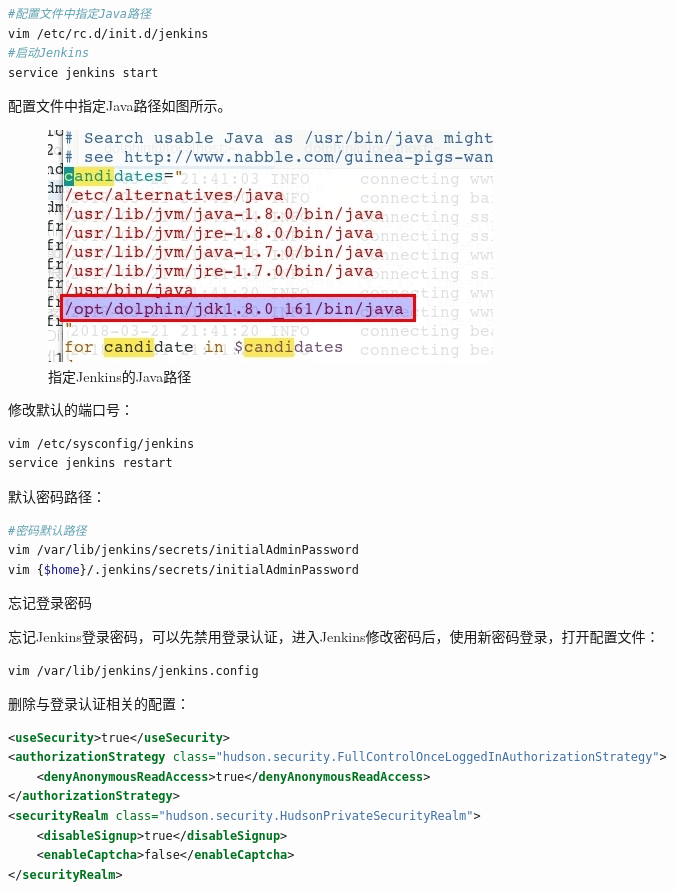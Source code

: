 \documentclass[12pt]{book}
\makeatletter
\numberwithin{dummy}{section}
\theoremstyle{ocrenumbox}
\theoremstyle{blacknumex}
\theoremstyle{blacknumbox}
\theoremstyle{ocrenum}
\renewcommand{\subsubsection}{\@startsection {subsubsection}{3}{\z@}
	{-2ex \@plus -0.1ex \@minus -.2ex}
	{.2ex \@plus.2ex }
	{\normalfont\small\sffamily\bfseries}}
\makeatother
\begin{document}
\begin{lstlisting}[language=bash]
#配置文件中指定Java路径
vim /etc/rc.d/init.d/jenkins
#启动Jenkins
service jenkins start
\end{lstlisting}

配置文件中指定Java路径如图所示。

\begin{figure}[htbp]
	\centering
	\includegraphics[scale=0.5]{specifyjavapath.jpg}
	\caption{指定Jenkins的Java路径}
	\label{fig:specifyjavapath}
\end{figure}

修改默认的端口号：

\begin{lstlisting}[language=bash]
vim /etc/sysconfig/jenkins
service jenkins restart
\end{lstlisting}

默认密码路径：

\begin{lstlisting}[language=bash]
#密码默认路径
vim /var/lib/jenkins/secrets/initialAdminPassword
vim {$home}/.jenkins/secrets/initialAdminPassword
\end{lstlisting}


\subsubsection{忘记登录密码}

忘记Jenkins登录密码，可以先禁用登录认证，进入Jenkins修改密码后，使用新密码登录，打开配置文件：

\begin{lstlisting}[language=bash]
vim /var/lib/jenkins/jenkins.config
\end{lstlisting}

删除与登录认证相关的配置：

\begin{lstlisting}[language=XML]
<useSecurity>true</useSecurity>  
<authorizationStrategy class="hudson.security.FullControlOnceLoggedInAuthorizationStrategy">  
	<denyAnonymousReadAccess>true</denyAnonymousReadAccess>  
</authorizationStrategy>  
<securityRealm class="hudson.security.HudsonPrivateSecurityRealm">  
	<disableSignup>true</disableSignup>  
	<enableCaptcha>false</enableCaptcha>  
</securityRealm>
\end{lstlisting}
\end{document}
